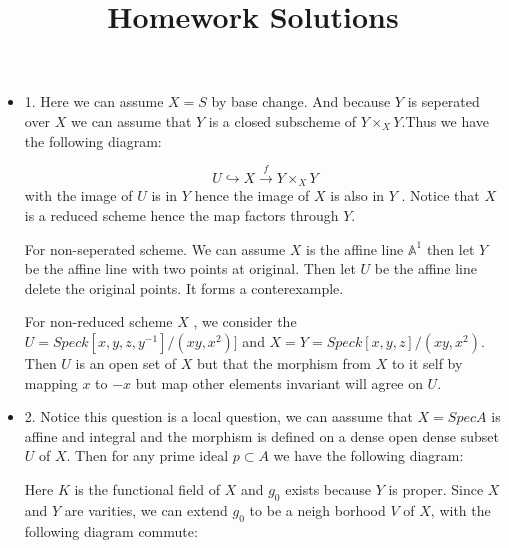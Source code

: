 \documentclass[10pt,letterpaper]{article}
\makeatletter
\newcommand\course[1]{\renewcommand\@course{#1}}
\newcommand\@course{}
\newcommand\term[1]{\renewcommand\@term{#1}}
\newcommand\@term{}
\theoremstyle{plain}
\theoremstyle{definition}
\theoremstyle{remark}
\makeatother
\begin{document}
\course{Algebraic Geometry}
\term{}
\title{Homework  Solutions}
\author{}
\maketitle
\begin{itemize}
\item 1. Here we can assume $X=S$ by base change. And because $Y$ is seperated over $X$ we can assume that $Y$ is a closed subscheme of $Y\times_{X}Y$.Thus we have the following diagram:

  \begin{displaymath}
    U \hookrightarrow X \xrightarrow{f} Y\times_{X}Y
  \end{displaymath}
with the image of $U$ is in $Y$ hence the image of $X$ is also in $Y$ . Notice that $X$ is a reduced scheme hence the map factors through $Y$.

For non-seperated scheme. We can assume $X$ is the affine line $\mathbb{A}^{1}$ then let $Y$ be the affine line with two points at original. Then let $U$ be the affine line delete the original points. It forms a conterexample.
 
For non-reduced scheme $X$ , we consider the $U=Spec k[x,y,z, y^{-1}]/(xy,x^{2})]$ and $X=Y=Spec k[x,y,z]/(xy,x^{2})$. Then $U$ is an open set of $X$ but that the morphism from $X$ to it self by mapping $x$ to $-x$ but map other elements invariant will agree on $U$.
\item 2. Notice this question is a local question, we can aassume that  $X=Spec A$ is affine and  integral and the morphism is defined on a dense open dense subset $U$ of $X$. Then for any prime ideal $p\subset A$ we have the following diagram:


Here $K$ is the functional field of $X$ and $g_{0}$ exists because $Y$ is proper.
Since $X$ and $Y$ are varities, we can extend $g_{0}$ to be a neigh borhood  $V$ of $X$, with the following diagram commute: 



\end{itemize}
\end{document}
